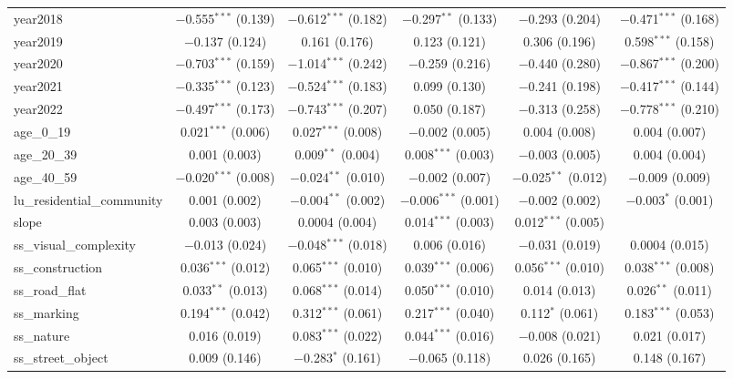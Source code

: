 \begin{table}[!htbp]
\begin{tabular}{@{\extracolsep{1pt}}lccccc}
  year2018 & $-$0.555$^{***}$ (0.139) & $-$0.612$^{***}$ (0.182) & $-$0.297$^{**}$ (0.133) & $-$0.293 (0.204) & $-$0.471$^{***}$ (0.168) \\ 
  year2019 & $-$0.137 (0.124) & 0.161 (0.176) & 0.123 (0.121) & 0.306 (0.196) & 0.598$^{***}$ (0.158) \\ 
  year2020 & $-$0.703$^{***}$ (0.159) & $-$1.014$^{***}$ (0.242) & $-$0.259 (0.216) & $-$0.440 (0.280) & $-$0.867$^{***}$ (0.200) \\ 
  year2021 & $-$0.335$^{***}$ (0.123) & $-$0.524$^{***}$ (0.183) & 0.099 (0.130) & $-$0.241 (0.198) & $-$0.417$^{***}$ (0.144) \\ 
  year2022 & $-$0.497$^{***}$ (0.173) & $-$0.743$^{***}$ (0.207) & 0.050 (0.187) & $-$0.313 (0.258) & $-$0.778$^{***}$ (0.210) \\ 
  age\_0\_19 & 0.021$^{***}$ (0.006) & 0.027$^{***}$ (0.008) & $-$0.002 (0.005) & 0.004 (0.008) & 0.004 (0.007) \\ 
  age\_20\_39 & 0.001 (0.003) & 0.009$^{**}$ (0.004) & 0.008$^{***}$ (0.003) & $-$0.003 (0.005) & 0.004 (0.004) \\ 
  age\_40\_59 & $-$0.020$^{***}$ (0.008) & $-$0.024$^{**}$ (0.010) & $-$0.002 (0.007) & $-$0.025$^{**}$ (0.012) & $-$0.009 (0.009) \\ 
  lu\_residential\_community & 0.001 (0.002) & $-$0.004$^{**}$ (0.002) & $-$0.006$^{***}$ (0.001) & $-$0.002 (0.002) & $-$0.003$^{*}$ (0.001) \\ 
  slope & 0.003 (0.003) & 0.0004 (0.004) & 0.014$^{***}$ (0.003) & 0.012$^{***}$ (0.005) &  \\ 
  ss\_visual\_complexity & $-$0.013 (0.024) & $-$0.048$^{***}$ (0.018) & 0.006 (0.016) & $-$0.031 (0.019) & 0.0004 (0.015) \\ 
  ss\_construction & 0.036$^{***}$ (0.012) & 0.065$^{***}$ (0.010) & 0.039$^{***}$ (0.006) & 0.056$^{***}$ (0.010) & 0.038$^{***}$ (0.008) \\ 
  ss\_road\_flat & 0.033$^{**}$ (0.013) & 0.068$^{***}$ (0.014) & 0.050$^{***}$ (0.010) & 0.014 (0.013) & 0.026$^{**}$ (0.011) \\ 
  ss\_marking & 0.194$^{***}$ (0.042) & 0.312$^{***}$ (0.061) & 0.217$^{***}$ (0.040) & 0.112$^{*}$ (0.061) & 0.183$^{***}$ (0.053) \\ 
  ss\_nature & 0.016 (0.019) & 0.083$^{***}$ (0.022) & 0.044$^{***}$ (0.016) & $-$0.008 (0.021) & 0.021 (0.017) \\ 
  ss\_street\_object & 0.009 (0.146) & $-$0.283$^{*}$ (0.161) & $-$0.065 (0.118) & 0.026 (0.165) & 0.148 (0.167) \\ 

\end{tabular}
\end{table}
